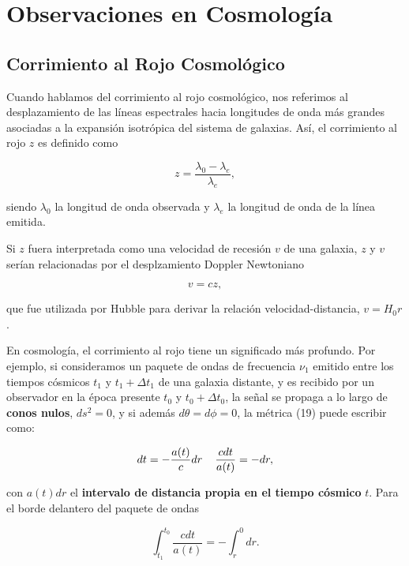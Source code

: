 \documentclass{article}
\begin{document}
\section{Observaciones en Cosmología}

\subsection{Corrimiento al Rojo Cosmológico}

Cuando hablamos del corrimiento al rojo cosmológico, nos referimos al desplazamiento de las líneas espectrales hacia longitudes de onda más grandes asociadas a la expansión isotrópica del sistema de galaxias. Así, el corrimiento al rojo $z$ es definido como

\begin{equation}
    z = \frac{\lambda_0 - \lambda_e}{\lambda_e},
\end{equation}

siendo $\lambda_0$ la longitud de onda observada y $\lambda_e$ la longitud de onda de la línea emitida.  



Si $z$ fuera interpretada como una velocidad de recesión $v$ de una galaxia, $z$ y $v$ serían relacionadas por el desplzamiento Doppler Newtoniano

    \begin{equation}
        v= cz,
    \end{equation}

que fue utilizada por Hubble para derivar la relación velocidad-distancia, $v=H_0 r$. 

En cosmología, el corrimiento al rojo tiene un significado más profundo. Por ejemplo, si consideramos un paquete de ondas de frecuencia $\nu_1$ emitido entre los tiempos cósmicos $t_1$ y $t_1 +  \Delta t_1$ de una galaxia distante, y es recibido por un observador en la época presente $t_0$ y $t_0 + \Delta t_0$, la señal se propaga a lo largo de {\bf{conos nulos}}, $ds^2=0$, y si además $d\theta = d\phi = 0$, la métrica (19) puede escribir como:

    \begin{equation}
        dt = - \frac{a(t)}{c} dr \hspace{0.4cm} \frac{c dt}{a(t)} = -dr,
    \end{equation} 

con $a(t) dr$ el {\bf{intervalo de distancia propia en el tiempo cósmico}} $t$. Para el borde delantero del paquete de ondas 

    \begin{equation}
        \int_{t_1}^{t_0} \frac{cdt}{a(t)} = - \int_r^0{dr}.
    \end{equation}
        
\end{document}

